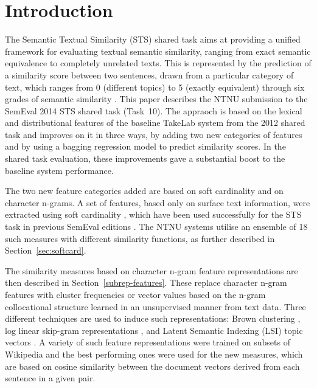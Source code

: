 \section{Introduction}
\label{intro}


The Semantic Textual Similarity (STS) shared task aims at providing a unified framework for evaluating textual semantic similarity, ranging from exact semantic equivalence to completely unrelated texts. This is represented by the prediction of a similarity score between two sentences, drawn from a particular category of text, which ranges from 0 (different topics) to 5 (exactly equivalent) through six grades of semantic similarity \cite{agirre-EtAl:2013:*SEM1}.
This paper describes the NTNU submission to the SemEval 2014 STS shared task (Task~10). 
The appraoch is based on the lexical and distributional features of the baseline TakeLab system 
from the 2012 shared task \cite{saric2012takelab} and improves on it in three ways,
by adding two new categories of features and by using a bagging regression model to predict similarity scores. 
In the shared task evaluation, these improvements gave a substantial boost to the baseline system performance.

The two new feature categories added are based on soft cardinality and on character n-grams. 
A set of features, based only on surface text information,
were extracted using soft cardinality \cite{chavez_text_2010}, which
have been used successfully for the STS task in previous SemEval editions
\cite{jimenez_soft_2012,jimenez_softcardinality_core:_2013}. 
The NTNU systems utilise an ensemble of 18 such measures with different similarity functions,
as further described in Section~\ref{sec:softcard}.

The similarity measures based on character n-gram feature representations are then
described in Section~\ref{subrep-features}.
These replace character n-gram features with cluster frequencies or vector values 
based on the n-gram collocational structure learned in an unsupervised manner from text data. 
Three different techniques are used to induce such representations: 
Brown clustering \cite{brown1992class}, log linear skip-gram representations \cite{mikolov2013efficient}, 
and Latent Semantic Indexing (LSI) topic vectors \cite{deerwester1990indexing}. 
A variety of such feature representations were trained on subsets of Wikipedia and the best performing ones 
were used for the new  measures, which are based on cosine similarity between the document vectors 
derived from each sentence in a given pair.

